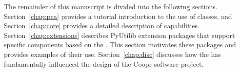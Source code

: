 \fi


The remainder of this manuscript is divided into the following sections.
Section~\ref{chap:pca} provides a tutorial introduction to the use of \pcasp classes,
and Section~\ref{chap:core} provides a detailed description of \pcasp capabilities.
Section~\ref{chap:extensions} describes PyUtilib extension
packages that support specific components based on the \pca.  This section
motivates these packages and provides examples of their use.  Section~\ref{chap:disc}
discusses how the \pcasp has 
fundamentally influenced the design of the Coopr software project.



